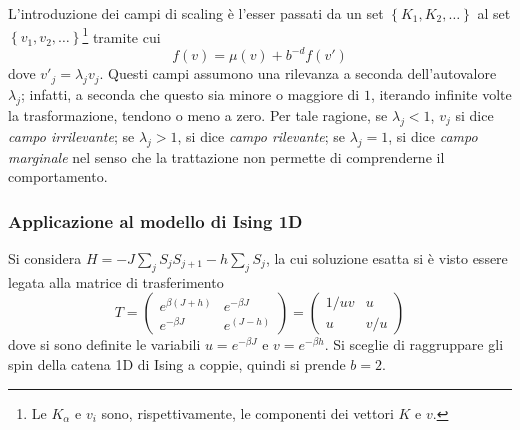 \documentclass[11pt, a4paper]{scrartcl}
\theoremstyle{style}
\theoremstyle{style1}
\numberwithin{equation}{subsection}
\begin{document}
L'introduzione dei campi di scaling \`e l'esser passati da un set $\left\{ K_1,K_2,\ldots \right\} $ al set $\left\{ v_1,v_2,\ldots \right\} $\footnote{Le $K_\alpha $ e $v_i$ sono, rispettivamente, le componenti dei vettori $K$ e $v$.} tramite cui
\[
f(v) = \mu (v) + b^{-d} f(v')
\] 
dove $v'_j=\lambda _j v_j$.
Questi campi assumono una rilevanza a seconda dell'autovalore $\lambda _j$; infatti, a seconda che questo sia minore o maggiore di $1$, iterando infinite volte la trasformazione, tendono o meno a zero.
Per tale ragione, se $\lambda _j < 1$, $v_j$ si dice \textit{campo irrilevante}; se $\lambda _j > 1$, si dice \textit{campo rilevante}; se $\lambda _j = 1$, si dice \textit{campo marginale} nel senso che la trattazione non permette di comprenderne il comportamento.
\subsubsection{Applicazione al modello di Ising 1D}
Si considera $H = - J \sum_{j}^{} S_j S_{j+1}  - h \sum_{j}^{} S_j$, la cui soluzione esatta si \`e visto essere legata alla matrice di trasferimento 
\[
	T = \begin{pmatrix} e^{\beta (J+h)} & e ^{-\beta J}\\ e^{-\beta J} & e^{(J-h)} \end{pmatrix} = \begin{pmatrix} 1 / uv & u \\ u & v / u \end{pmatrix} 
\] 
dove si sono definite le variabili $u = e^{-\beta J}$ e $v = e^{-\beta h}$.
Si sceglie di raggruppare gli spin della catena 1D di Ising a coppie, quindi si prende $b=2$.
\end{document}
